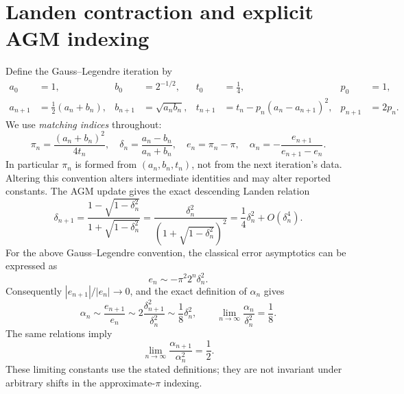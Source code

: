 \documentclass[11pt]{article}
\begin{document}
\section{Landen contraction and explicit AGM indexing}
Define the Gauss--Legendre iteration by
\begin{align*}
a_0&=1,&b_0&=2^{-1/2},&t_0&=\tfrac14,&p_0&=1,\\
a_{n+1}&=\tfrac12(a_n+b_n),&b_{n+1}&=\sqrt{a_nb_n},
&t_{n+1}&=t_n-p_n(a_n-a_{n+1})^2,&p_{n+1}&=2p_n.
\end{align*}
We use \emph{matching indices} throughout:
\[
\boxed{\pi_n=\frac{(a_n+b_n)^2}{4t_n},\quad
\delta_n=\frac{a_n-b_n}{a_n+b_n},\quad e_n=\pi_n-\pi,\quad
\alpha_n=-\frac{e_{n+1}}{e_{n+1}-e_n}.}
\]
In particular $\pi_n$ is formed from $(a_n,b_n,t_n)$, not from the next iteration's data. Altering this convention alters intermediate identities and may alter reported constants. The AGM update gives the exact descending Landen relation
\[
\delta_{n+1}=\frac{1-\sqrt{1-\delta_n^2}}{1+\sqrt{1-\delta_n^2}}
=\frac{\delta_n^2}{(1+\sqrt{1-\delta_n^2})^2}
=\frac14\delta_n^2+O(\delta_n^4).
\]
For the above Gauss--Legendre convention, the classical error asymptotics can be expressed as
\[
e_n\sim-\pi^2 2^n\delta_n^2.
\]
Consequently $|e_{n+1}|/|e_n|\to0$, and the exact definition of $\alpha_n$ gives
\[
\alpha_n\sim\frac{e_{n+1}}{e_n}
\sim2\frac{\delta_{n+1}^2}{\delta_n^2}
\sim\frac18\delta_n^2,
\qquad\boxed{\lim_{n\to\infty}\frac{\alpha_n}{\delta_n^2}=\frac18.}
\]
The same relations imply
\[
\boxed{\lim_{n\to\infty}\frac{\alpha_{n+1}}{\alpha_n^2}=\frac12.}
\]
These limiting constants use the stated definitions; they are not invariant under arbitrary shifts in the approximate-$\pi$ indexing.
\end{document}
